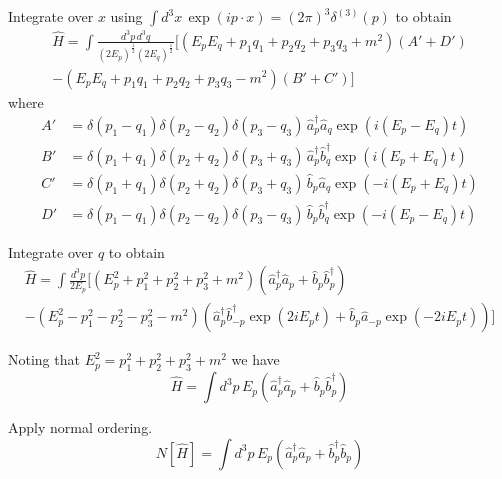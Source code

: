 \documentclass[12pt]{article}
\begin{document}
Integrate over $x$ using $\int d^3x\,\exp(ip\cdot x)=(2\pi)^3\delta^{(3)}(p)$ to obtain
\begin{multline*}
\hat H
=\int\frac{d^3p\,d^3q}{(2E_p)^\frac{1}{2}(2E_q)^\frac{1}{2}}
\bigg[(E_pE_q+p_1q_1+p_2q_2+p_3q_3+m^2)(A'+D')
\\
-(E_pE_q+p_1q_1+p_2q_2+p_3q_3-m^2)(B'+C')\bigg]
\end{multline*}
where
\begin{align*}
A'&=\delta(p_1-q_1)\delta(p_2-q_2)\delta(p_3-q_3)\,\hat a_p^\dag\hat a_q\exp(i(E_p-E_q)t)
\\
B'&=\delta(p_1+q_1)\delta(p_2+q_2)\delta(p_3+q_3)\,\hat a_p^\dag\hat b_q^\dag\exp(i(E_p+E_q)t)
\\
C'&=\delta(p_1+q_1)\delta(p_2+q_2)\delta(p_3+q_3)\,\hat b_p\hat a_q\exp(-i(E_p+E_q)t)
\\
D'&=\delta(p_1-q_1)\delta(p_2-q_2)\delta(p_3-q_3)\,\hat b_p\hat b_q^\dag\exp(-i(E_p-E_q)t)
\end{align*}

Integrate over $q$ to obtain
\begin{multline*}
\hat H=\int\frac{d^3p}{2E_p}
\bigg[(E_p^2+p_1^2+p_2^2+p_3^2+m^2)
\left(\hat a_p^\dag\hat a_p+\hat b_p\hat b_p^\dag\right)
\\
-(E_p^2-p_1^2-p_2^2-p_3^2-m^2)
\left(\hat a_p^\dag\hat b_{-p}^\dag\exp(2iE_pt)+\hat b_p\hat a_{-p}\exp(-2iE_pt)\right)\bigg]
\end{multline*}

Noting that $E_p^2=p_1^2+p_2^2+p_3^2+m^2$ we have
\begin{equation*}
\hat H=\int d^3p\,E_p\left(\hat a_p^\dag\hat a_p+\hat b_p\hat b_p^\dag\right)
\end{equation*}

Apply normal ordering.
\begin{equation*}
N[\hat H]=\int d^3p\,E_p\left(\hat a_p^\dag\hat a_p+\hat b_p^\dag\hat b_p\right)
\end{equation*}
\end{document}
